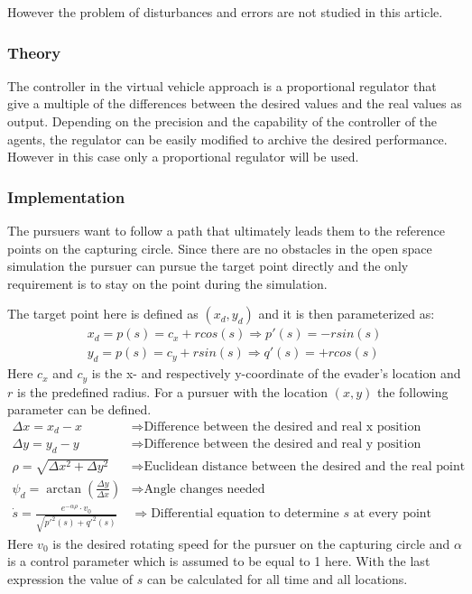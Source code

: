 \documentclass[ebook,11pt] {kth-mag}
\begin{document}
However the problem of disturbances and errors are not studied in this article. 

\subsubsection{Theory}
The controller in the virtual vehicle approach is a proportional regulator that give a multiple of the differences between the desired values and the real values as output. Depending on the precision and the capability of the controller of the agents, the regulator can be easily modified to archive the desired performance. However in this case only a  proportional regulator will be used. 


\subsubsection{Implementation}
The pursuers want to follow a path that ultimately leads them to the reference points on the capturing circle. Since there are no obstacles in the open space simulation the pursuer can pursue the target point directly and the only requirement is to stay on the point during the simulation. 

The target point here is defined as $(x_d, y_d)$ and it is then parameterized as:
\begin{equation}
\begin{split}
x_d = p(s) = c_x + r cos(s) \Rightarrow p'(s) = -r sin(s)\\ 
y_d = p(s) = c_y + r sin(s) \Rightarrow q'(s) = +r cos(s)
\end{split}
\end{equation}
Here $c_x$ and $c_y$ is the x- and respectively y-coordinate of the evader's location and $r$ is the predefined radius. For a pursuer with the location $(x,y)$ the following parameter can be defined. 
\begin{equation}
\begin{split}
\Delta x  = x_{d} - x & \Rightarrow \textrm{Difference between the desired and real x position} \\
\Delta y  = y_{d} - y & \Rightarrow \textrm{Difference between the desired and real y position} \\
\rho = \sqrt{\Delta x^2 + \Delta y^2} & \Rightarrow \textrm{Euclidean distance between the desired and the real point} \\
\psi_{d} = \arctan(\frac{\Delta y}{\Delta x}) & \Rightarrow \textrm{Angle changes needed} \\
\dot{s} = \frac{e^{-\alpha \rho} \cdot v_{0}}{\sqrt{p'^2(s)+q'^2(s)}} & \Rightarrow \textrm{Differential equation to determine $s$ at every point}
\end{split}
\end{equation}
Here $v_0$ is the desired rotating speed for the pursuer on the capturing circle and $\alpha$ is a control parameter which is assumed to be equal to 1 here. With the last expression the value of $s$ can be calculated for all time and all locations. 
\end{document}
